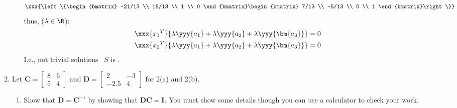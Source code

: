 \documentclass[basic]{inVerba-notes}
\begin{document}
\begin{enumerate}[align=left, leftmargin=0pt, labelindent=\parindent, listparindent=\parindent, labelwidth=0pt, itemindent=!]
\begin{enumerate}
{\begin{itemize}
      \[%
      \xxx{\left\{\begin{bmatrix} -21/13 \\ 15/13 \\ 1 \\ 0 \end{bmatrix}\begin{bmatrix} 7/13 \\ -5/13 \\ 0 \\ 1 \end{bmatrix}\right\}}
      \]%
      thus, (\(\lambda \in \R\)):
      \begin{align*}
        \xxx{{x_1}^T}\{\lambda\yyy{a_1} + \lambda\yyy{a_2}+ \lambda\yyy{\bm{a_3}} \} = 0 \\
        \xxx{{x_2}^T}\{\lambda\yyy{a_1} + \lambda\yyy{a_2}+ \lambda\yyy{\bm{a_3}} \} = 0 
      \end{align*}
      I.e., not trivial solutions \to~\(S\) is .
    \end{itemize}}
    
  \end{enumerate}

  \newpage

  \item Let \(\bm{C}=\begin{bmatrix}8 & 6\\5 & 4\end{bmatrix}\) and \(\bm{D}=\begin{bmatrix}2 & -3\\-2.5 & 4\end{bmatrix}\) for 2(a) and 2(b).
  
  \begin{enumerate}
    \item {} Show that \(\bm{D}=\bm{C}^{-1}\) by showing that \(\bm{DC}=\bm{I}\). You must show some details though you can use a calculator to check your work.
    

\end{enumerate}
\end{enumerate}
\end{document}
